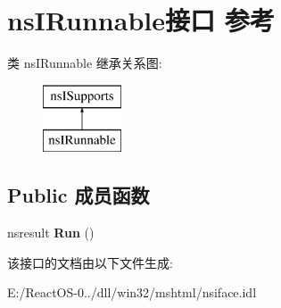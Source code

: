 \hypertarget{interfacens_i_runnable}{}\section{ns\+I\+Runnable接口 参考}
\label{interfacens_i_runnable}
类 ns\+I\+Runnable 继承关系图\+:\begin{figure}[H]
\begin{center}
\leavevmode
\includegraphics[height=2.000000cm]{interfacens_i_runnable}
\end{center}
\end{figure}
\subsection*{Public 成员函数}
\begin{DoxyCompactItemize}
\item 
\mbox{\label{interfacens_i_runnable_a65a4f33f829bcfae6df6e8a5850373c4}} 
nsresult {\bfseries Run} ()
\end{DoxyCompactItemize}


该接口的文档由以下文件生成\+:\begin{DoxyCompactItemize}
\item 
E\+:/\+React\+O\+S-\/0../dll/win32/mshtml/nsiface.\+idl\end{DoxyCompactItemize}
